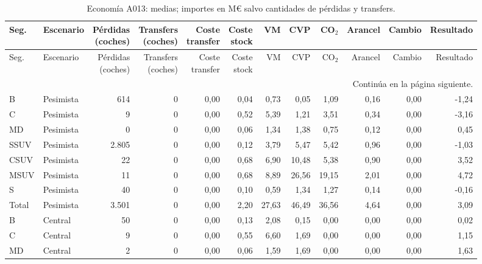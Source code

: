 \begin{longtable}{@{}llrrrrrrrrrr@{}}
\caption{Economía A013: medias; importes en M\euro{} salvo cantidades de pérdidas y transfers.}\label{tab:anexo-economia}\\
\toprule
Seg. & Escenario & \makecell{Pérdidas\\(coches)} & \makecell{Transfers\\(coches)} & \makecell{Coste\\transfer} & \makecell{Coste\\stock} & VM & CVP & CO$_2$ & Arancel & Cambio & Resultado \\
\midrule
\endfirsthead
\toprule
Seg. & Escenario & \makecell{Pérdidas\\(coches)} & \makecell{Transfers\\(coches)} & \makecell{Coste\\transfer} & \makecell{Coste\\stock} & VM & CVP & CO$_2$ & Arancel & Cambio & Resultado \\
\midrule
\endhead
\midrule
\multicolumn{12}{r}{\footnotesize Continúa en la página siguiente.}\\
\endfoot
\bottomrule
\endlastfoot
B & Pesimista & 614 & 0 & 0,00 & 0,04 & 0,73 & 0,05 & 1,09 & 0,16 & 0,00 & -1,24 \\
C & Pesimista & 9 & 0 & 0,00 & 0,52 & 5,39 & 1,21 & 3,51 & 0,34 & 0,00 & -3,16 \\
MD & Pesimista & 0 & 0 & 0,00 & 0,06 & 1,34 & 1,38 & 0,75 & 0,12 & 0,00 & 0,45 \\
SSUV & Pesimista & 2.805 & 0 & 0,00 & 0,12 & 3,79 & 5,47 & 5,42 & 0,96 & 0,00 & -1,03 \\
CSUV & Pesimista & 22 & 0 & 0,00 & 0,68 & 6,90 & 10,48 & 5,38 & 0,90 & 0,00 & 3,52 \\
MSUV & Pesimista & 11 & 0 & 0,00 & 0,68 & 8,89 & 26,56 & 19,15 & 2,01 & 0,00 & 4,72 \\
S & Pesimista & 40 & 0 & 0,00 & 0,10 & 0,59 & 1,34 & 1,27 & 0,14 & 0,00 & -0,16 \\
\rowcolor{fondo}
Total & Pesimista & 3.501 & 0 & 0,00 & 2,20 & 27,63 & 46,49 & 36,56 & 4,64 & 0,00 & 3,09 \\
\addlinespace[5pt]
B & Central & 50 & 0 & 0,00 & 0,13 & 2,08 & 0,15 & 0,00 & 0,00 & 0,00 & 0,02 \\
C & Central & 9 & 0 & 0,00 & 0,55 & 6,60 & 1,69 & 0,00 & 0,00 & 0,00 & 1,15 \\
MD & Central & 2 & 0 & 0,00 & 0,06 & 1,59 & 1,69 & 0,00 & 0,00 & 0,00 & 1,63 \\

\end{longtable}
